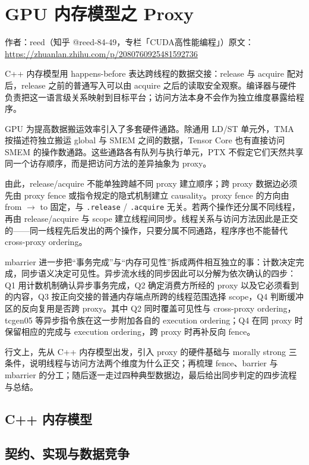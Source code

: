 \chapter{GPU 内存模型之 Proxy}

\begin{center}\small 作者：reed（知乎 @reed-84-49，专栏「CUDA高性能编程」）\quad 原文：\url{https://zhuanlan.zhihu.com/p/2080760925481592736}\end{center}

C++ 内存模型用 happens-before 表达跨线程的数据交接：release 与 acquire 配对后，release 之前的普通写入可以由 acquire 之后的读取安全观察。编译器与硬件负责把这一语言级关系映射到目标平台；访问方法本身不会作为独立维度暴露给程序。

GPU 为提高数据搬运效率引入了多套硬件通路。除通用 LD/ST 单元外，TMA 按描述符独立搬运 global 与 SMEM 之间的数据，Tensor Core 也有直接访问 SMEM 的操作数通路。这些通路各有队列与执行单元，PTX 不假定它们天然共享同一个访存顺序，而是把访问方法的差异抽象为 proxy。

由此，release/acquire 不能单独跨越不同 proxy 建立顺序；跨 proxy 数据边必须先由 proxy fence 或指令规定的隐式机制建立 causality。proxy fence 的方向由 from $\rightarrow$ to 固定，与 \lstinline|.release| / \lstinline|.acquire| 无关。若两个操作还分属不同线程，再由 release/acquire 与 scope 建立线程间同步。线程关系与访问方法因此是正交的——同一线程先后发出的两个操作，只要分属不同通路，程序序也不能替代 cross-proxy ordering。

mbarrier 进一步把“事务完成”与“内存可见性”拆成两件相互独立的事：计数决定完成，同步语义决定可见性。异步流水线的同步因此可以分解为依次确认的四步：Q1 用计数机制确认异步事务完成，Q2 确定消费方所经的 proxy 以及它必须看到的内容，Q3 按正向交接的普通内存端点所跨的线程范围选择 scope，Q4 判断缓冲区的反向复用是否跨 proxy。其中 Q2 同时覆盖可见性与 cross-proxy ordering，tcgen05 等异步指令族在这一步附加各自的 execution ordering；Q4 在同 proxy 时保留相应的完成与 execution ordering，跨 proxy 时再补反向 fence。

行文上，先从 C++ 内存模型出发，引入 proxy 的硬件基础与 morally strong 三条件，说明线程与访问方法两个维度为什么正交；再梳理 fence、barrier 与 mbarrier 的分工；随后逐一走过四种典型数据边，最后给出同步判定的四步流程与总结。

\section{C++ 内存模型}

\section{契约、实现与数据竞争}

